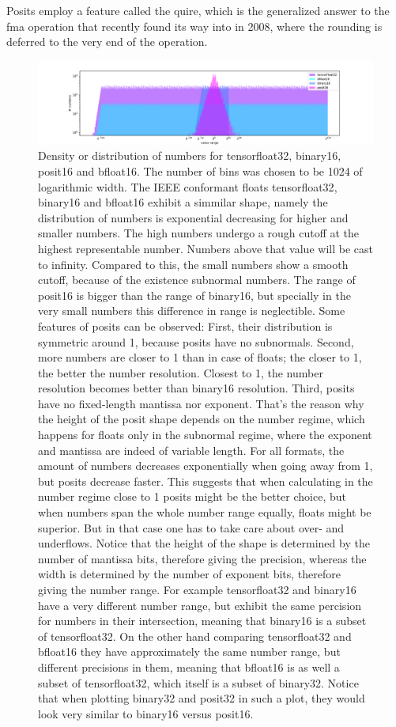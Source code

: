 \documentclass{article}
\theoremstyle{plain} %
\theoremstyle{remark} %
\numberwithin{equation}{section}
\begin{document}
Posits employ a feature called the \gls{quire}, which is the generalized answer to the \gls{fma} operation that recently found its way into \cite{ieee754_2008} in 2008, where the rounding is deferred to the very end of the operation.

\begin{figure}
    \centering
    \includegraphics[width=1.0\textwidth]{plots/number_line}
    \caption{Density or distribution of numbers for \gls{tensorfloat32}, \gls{binary16}, \gls{posit16} and \gls{bfloat16}. The number of bins was chosen to be \num{1024} of logarithmic width. The IEEE conformant floats \gls{tensorfloat32}, \gls{binary16} and \gls{bfloat16} exhibit a simmilar shape, namely the distribution of numbers is exponential decreasing for higher and smaller numbers. The high numbers undergo a rough cutoff at the highest representable number. Numbers above that value will be cast to infinity. Compared to this, the small numbers show a smooth cutoff, because of the existence subnormal numbers. The range of \gls{posit16} is bigger than the range of \gls{binary16}, but specially in the very small numbers this difference in range is neglectible. Some features of posits can be observed: First, their distribution is symmetric around \num{1}, because posits have no subnormals. Second, more numbers are closer to \num{1} than in case of floats; the closer to \num{1}, the better the number resolution. Closest to \num{1}, the number resolution becomes better than \gls{binary16} resolution. Third, posits have no fixed-length mantissa nor exponent. That's the reason why the height of the posit shape depends on the number regime, which happens for floats only in the subnormal regime, where the exponent and mantissa are indeed of variable length. For all formats, the amount of numbers decreases exponentially when going away from \num{1}, but posits decrease faster. This suggests that when calculating in the number regime close to \num{1} posits might be the better choice, but when numbers span the whole number range equally, floats might be superior. But in that case one has to take care about over- and underflows. Notice that the height of the shape is determined by the number of mantissa bits, therefore giving the precision, whereas the width is determined by the number of exponent bits, therefore giving the number range. For example \gls{tensorfloat32} and \gls{binary16} have a very different number range, but exhibit the same percision for numbers in their intersection, meaning that \gls{binary16} is a subset of \gls{tensorfloat32}. On the other hand comparing \gls{tensorfloat32} and \gls{bfloat16} they have approximately the same number range, but different precisions in them, meaning that \gls{bfloat16} is as well a subset of \gls{tensorfloat32}, which itself is a subset of \gls{binary32}. Notice that when plotting \gls{binary32} and \gls{posit32} in such a plot, they would look very similar to \gls{binary16} versus \gls{posit16}.}

\end{figure}
\end{document}
